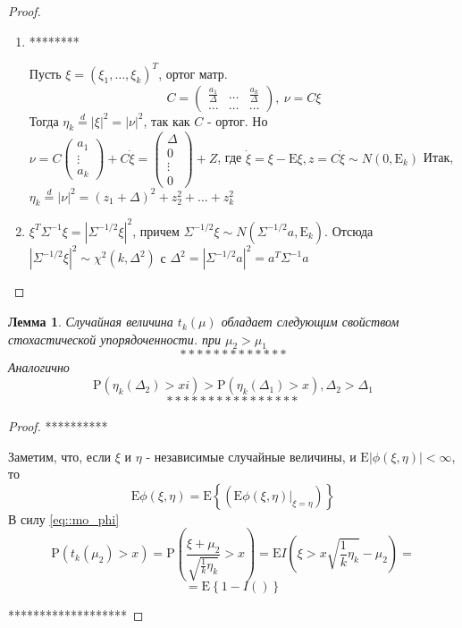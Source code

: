 \documentclass[12pt]{article}
\newtheorem{lemma}{Лемма}
\theoremstyle{basic_theorem}
\theoremstyle{name_theorem}
\def\E{
    \mathrm{E}
}
\def\P{
    \mathrm{P}
}
\begin{document}
\begin{proof}
    \begin{enumerate}
        \item ********
        
        Пусть $\xi=(\xi_1,\ldots, \xi_k)^T$, ортог матр.
        $$C=\begin{pmatrix}
            \frac{a_1}{\Delta}& \ldots& \frac{a_k}{\Delta} \\
            \ldots & \ldots &\ldots
        \end{pmatrix},\ \nu=C\xi$$
        Тогда $\eta_k\overset{d}{=}|\xi|^2=|\nu|^2$, так как $C$ - ортог.
        Но $\nu=C\begin{pmatrix}
            a_1 \\
            \vdots \\
            a_k
        \end{pmatrix} + C\dot{\xi}=\begin{pmatrix}
            \Delta \\
            0 \\
            \vdots \\
            0
        \end{pmatrix} + Z$, где $\dot{\xi}=\xi-\E\xi, z=C\dot{\xi}\sim N(0, \E_k)$
        Итак, $\eta_k\overset{d}{=}|\nu|^2=(z_1+\Delta)^2+z_2^2+\ldots+z_k^2$
        \item $\xi^T\Sigma^{-1}\xi=|\Sigma^{-1/2}\xi|^2$, причем $\Sigma^{-1/2}\xi\sim N(\Sigma^{-1/2}a, \E_k)$.
        Отсюда $|\Sigma^{-1/2}\xi|^2\sim\chi^2(k,\Delta^2)$ с $\Delta^2=|\Sigma^{-1/2}a|^2=a^T\Sigma^{-1}a$
    \end{enumerate}
\end{proof}
    \begin{lemma}
        Случайная величина $t_k(\mu)$ обладает следующим свойством стохастической упорядоченности.
        при $\mu_2>\mu_1$
        \begin{equation}
            *************
        \end{equation}
        Аналогично 
        \begin{equation}
            \P(\eta_k(\Delta_2)>xi) > \P(\eta_k(\Delta_1)>x), \Delta_2 > \Delta_1
        \end{equation}
        \begin{equation}
            ****************
        \end{equation}
    \end{lemma}
    \begin{proof}
        **********

        Заметим, что, если $\xi$ и $\eta$ - независимые случайные величины,
        и $\E|\phi(\xi,\eta)|<\infty$, то
        \begin{equation} \label{eq::mo_phi}
            \E\phi(\xi,\eta)=\E\left\{(\E\phi(\xi,\eta)\vert_{\xi=\eta})\right\}
        \end{equation}
        В силу \eqref{eq::mo_phi}
        $$\P(t_k(\mu_2)>x) = \P(\frac{\xi+\mu_2}{\sqrt{\frac{1}{k}\eta_k}}>x)=\E I(\xi>x\sqrt{\frac{1}{k}\eta_k}-\mu_2)=$$
        $$= \E\left\{1-I()\right\}$$

        *******************
    \end{proof}
\end{document}
